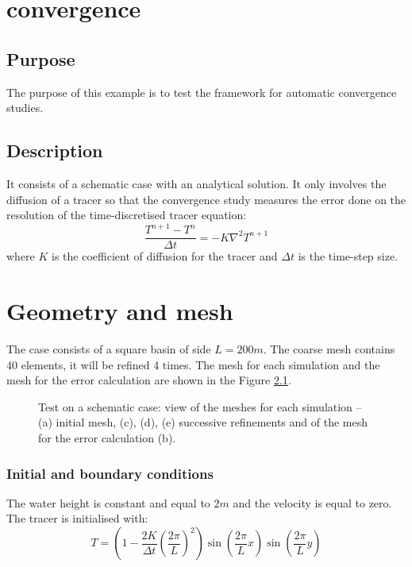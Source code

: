 \chapter{convergence}

\section{Purpose}
The purpose of this example is to test the framework for automatic
convergence studies.

\section{Description}
It consists of a schematic case with an analytical solution.
It only involves the diffusion of a tracer so that the convergence study
measures the error done on the resolution of the time-discretised
tracer equation:
\begin{equation}
\dfrac{T^{n+1} - T^{n}}{\Delta t} = -K \nabla^2 T^{n+1}
\end{equation}
where $K$ is the coefficient of diffusion for the tracer
and $\Delta t$ is the time-step size.

\chapter{Geometry and mesh}
The case consists of a square basin of side $L=200m$.
The coarse mesh contains 40 elements, it will be refined 4 times.
The mesh for each simulation and the mesh for
the error calculation are shown in the Figure \ref{fig:figure1}.

\begin{figure}
  \begin{center}
    \caption{Test on a schematic case: view of the meshes for each simulation
    -- (a) initial mesh, (c), (d), (e) successive refinements and
    of the mesh for the error calculation (b).}
    \label{fig:figure1}
  \end{center}
\end{figure}

\subsection{Initial and boundary conditions}
The water height is constant and equal to $2m$ and the velocity
is equal to zero.
The tracer is initialised with:
\begin{equation}
T = \left(1 - \dfrac{2 K}{\Delta t}\left(\dfrac{2 \pi}{L}\right)^2 \right)
\sin \left(\dfrac{2 \pi}{L}x \right)
\sin \left( \dfrac{2 \pi}{L}y\right)
\end{equation}


